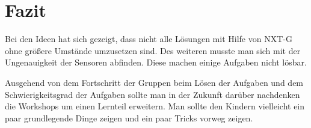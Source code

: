 \chapter{Fazit}


Bei den Ideen hat sich gezeigt, dass nicht alle Lösungen mit Hilfe von NXT-G ohne größere Umstände umzusetzen sind. Des weiteren musste man sich mit der Ungenauigkeit der Sensoren abfinden. Diese machen einige Aufgaben nicht lösbar.

Ausgehend von dem Fortschritt der Gruppen beim Lösen der Aufgaben und dem Schwierigkeitsgrad der Aufgaben sollte man in der Zukunft darüber nachdenken die Workshops um einen Lernteil erweitern. Man sollte den Kindern vielleicht ein paar grundlegende Dinge zeigen und ein paar Tricks vorweg zeigen. 